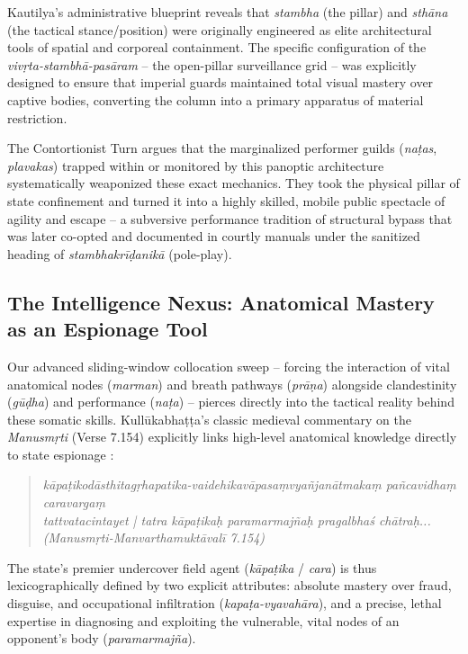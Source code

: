 \documentclass[11pt,twoside,letterpaper]{article}
\begin{document}
Kautilya’s administrative blueprint reveals that \textit{stambha} (the pillar) and \textit{sthāna} (the tactical stance/position) were originally engineered as elite architectural tools of spatial and corporeal containment. The specific configuration of the \textit{vivṛta-stambhā-pasāram} -- the open-pillar surveillance grid -- was explicitly designed to ensure that imperial guards maintained total visual mastery over captive bodies, converting the column into a primary apparatus of material restriction. 

The Contortionist Turn argues that the marginalized performer guilds (\textit{naṭas}, \textit{plavakas}) trapped within or monitored by this panoptic architecture systematically weaponized these exact mechanics. They took the physical pillar of state confinement and turned it into a highly skilled, mobile public spectacle of agility and escape -- a subversive performance tradition of structural bypass that was later co-opted and documented in courtly manuals under the sanitized heading of \textit{stambhakrīḍanikā} (pole-play).

\subsection{The Intelligence Nexus: Anatomical Mastery as an Espionage Tool}

Our advanced sliding-window collocation sweep -- forcing the interaction of vital anatomical nodes (\textit{marman}) and breath pathways (\textit{prāṇa}) alongside clandestinity (\textit{gūḍha}) and performance (\textit{naṭa}) -- pierces directly into the tactical reality behind these somatic skills. Kullūkabhaṭṭa’s classic medieval commentary on the \textit{Manusmṛti} (Verse 7.154) explicitly links high-level anatomical knowledge directly to state espionage \cite{GRETIL_vcp}:
\begin{quote}
    \textit{kāpaṭikodāsthitagṛhapatika-vaidehikavāpasaṃvyañjanātmakaṃ pañcavidhaṃ caravargaṃ} \\
    \textit{tattvatacintayet | tatra kāpaṭikaḥ paramarmajñaḥ pragalbhaś chātraḥ... (Manusmṛti-Manvarthamuktāvalī 7.154)}
\end{quote}

The state’s premier undercover field agent (\textit{kāpaṭika} / \textit{cara}) is thus lexicographically defined by two explicit attributes: absolute mastery over fraud, disguise, and occupational infiltration (\textit{kapaṭa-vyavahāra}), and a precise, lethal expertise in diagnosing and exploiting the vulnerable, vital nodes of an opponent's body (\textit{paramarmajña}). 
\end{document}
